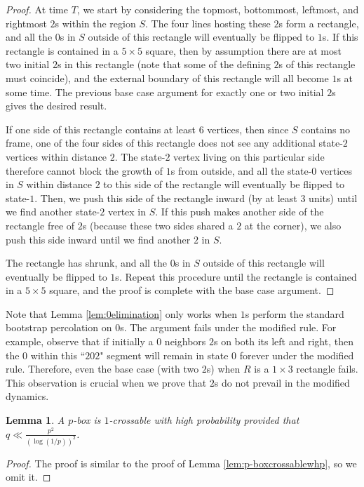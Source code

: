 \documentclass{article}
\numberwithin{equation}{section}
\newtheorem{lemma}[theorem]{Lemma}
\begin{document}
\begin{proof}
    At time $T$, we start by considering the topmost, bottommost, leftmost, and rightmost $2$s within the region $S$.
    The four lines hosting these $2$s form a rectangle, and all the $0$s in $S$ outside of this rectangle will eventually be flipped to $1$s.
    If this rectangle is contained in a $5 \times 5$ square, then by assumption there are at most two initial $2$s in this rectangle (note that some of the defining $2$s of this rectangle must coincide), and the external boundary of this rectangle will all become $1$s at some time. 
    The previous base case argument for exactly one or two initial $2$s gives the desired result. 
    
    If one side of this rectangle contains at least $6$ vertices, then since $S$ contains no frame, one of the four sides of this rectangle does not see any additional state-$2$ vertices within distance $2$.
    The state-$2$ vertex living on this particular side therefore cannot block the growth of $1$s from outside, and all the state-$0$ vertices in $S$ within distance $2$ to this side of the rectangle will eventually be flipped to state-$1$.
    Then, we push this side of the rectangle inward (by at least $3$ units) until we find another state-$2$ vertex in $S$.
    If this push makes another side of the rectangle free of $2$s (because these two sides shared a $2$ at the corner), we also push this side inward until we find another $2$ in $S$.
    
    The rectangle has shrunk, and all the $0$s in $S$ outside of this rectangle will eventually be flipped to $1$s.
    Repeat this procedure until the rectangle is contained in a $5 \times 5$ square, and the proof is complete with the base case argument.
\end{proof}

Note that Lemma \ref{lem:0elimination} only works when $1$s perform the standard bootstrap percolation on $0$s.
The argument fails under the modified rule.
For example, observe that if initially a $0$ neighbors $2$s on both its left and right, then the $0$ within this ``$202$" segment will remain in state $0$ forever under the modified rule. Therefore, even the base case (with two $2$s) when $R$ is a $1\times 3$ rectangle fails.
This observation is crucial when we prove that $2$s do not prevail in the modified dynamics.

\begin{lemma}\label{lem:p-boxcrossable}
    A $p$-box is $1$-crossable with high probability provided that $q \ll \frac{p^2}{(\log(1/p))^2}$.
\end{lemma}
\begin{proof}
    The proof is similar to the proof of Lemma \ref{lem:p-boxcrossablewhp}, so we omit it.
\end{proof}
\end{document}
